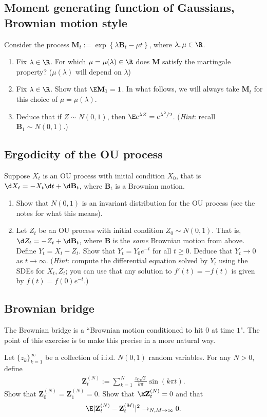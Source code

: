 \documentclass[12pt,reqno]{amsart}
\theoremstyle{definition}
\theoremstyle{remark}
\numberwithin{equation}{section}
\begin{document}
\subsection{Moment generating function of Gaussians, Brownian motion style}
Consider the process $\mathbf{M}_{t}:=\exp\left\{\lambda\mathbf{B}_{t}-\mu t\right\}$, where $\lambda,\mu\in\R$.
\begin{enumerate}
\item Fix $\lambda\in\R$. For which $\mu=\mu(\lambda)\in\R$ does $\mathbf{M}$ satisfy the martingale property? ($\mu(\lambda)$ will depend on $\lambda$)
\item Fix $\lambda\in\R$. Show that $\E\mathbf{M}_{1}=1$. In what follows, we will always take $\mathbf{M}_{t}$ for this choice of $\mu=\mu(\lambda)$.
\item Deduce that if $Z\sim N(0,1)$, then $\E e^{\lambda Z}=e^{\lambda^{2}/2}$. (\emph{Hint}: recall $\mathbf{B}_{1}\sim N(0,1)$.)
\end{enumerate}
\subsection{Ergodicity of the OU process}
Suppose $X_{t}$ is an OU process with initial condition $X_{0}$, that is $\d X_{t}=- X_{t}\d t+\d\mathbf{B}_{t}$, where $\mathbf{B}_{t}$ is a Brownian motion.
\begin{enumerate}
\item Show that $N(0,1)$ is an invariant distribution for the OU process (see the notes for what this means).
\item Let $Z_{t}$ be an OU process with initial condition $Z_{0}\sim N(0,1)$. That is, $\d Z_{t}=- Z_{t}+\d\mathbf{B}_{t}$, where $\mathbf{B}$ is the \emph{same} Brownian motion from above. Define $Y_{t}=X_{t}-Z_{t}$. Show that $Y_{t}=Y_{0}e^{-t}$ for all $t\geq0$. Deduce that $Y_{t}\to0$ as $t\to\infty$. (\emph{Hint}: compute the differential equation solved by $Y_{t}$ using the SDEs for $X_{t},Z_{t}$; you can use that any solution to $f'(t)=-f(t)$ is given by $f(t)=f(0)e^{-t}$.)
\end{enumerate}
\subsection{Brownian bridge}
The Brownian bridge is a ``Brownian motion conditioned to hit $0$ at time $1$". The point of this exercise is to make this precise in a more natural way. 

Let $\{z_{k}\}_{k=1}^{\infty}$ be a collection of i.i.d. $N(0,1)$ random variables. For any $N>0$, define 
%
\begin{align*}
\mathbf{Z}^{(N)}_{t}:=\sum_{k=1}^{N}\frac{z_{k}\sqrt{2}}{k\pi}\sin(k\pi t).
\end{align*}
%
Show that $\mathbf{Z}^{(N)}_{0}=\mathbf{Z}^{(N)}_{1}=0$. Show that $\E\mathbf{Z}^{(N)}_{t}=0$ and that
%
\begin{align*}
\E|\mathbf{Z}^{(N)}_{t}-\mathbf{Z}^{(M)}_{t}|^{2}\to_{N,M\to\infty}0.
\end{align*}
%
\end{document}
